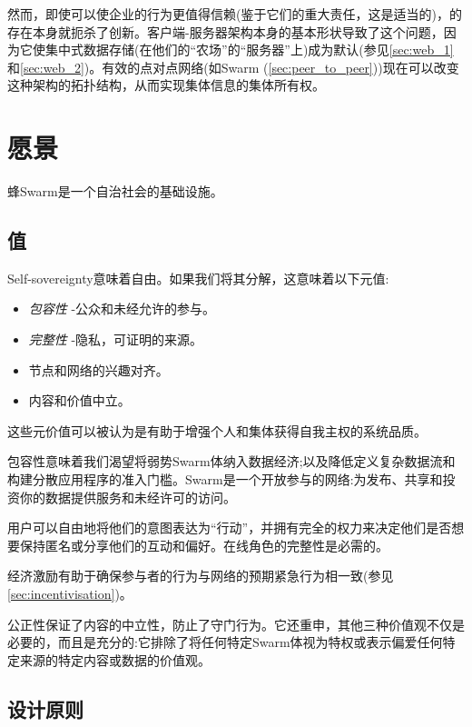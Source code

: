 然而，即使可以使企业的行为更值得信赖(鉴于它们的重大责任，这是适当的)，的存在本身就扼杀了创新。客户端-服务器架构本身的基本形状导致了这个问题，因为它使集中式数据存储(在他们的“农场”的“服务器”上)成为默认(参见\ref{sec:web_1}和\ref{sec:web_2})。有效的点对点网络(如Swarm (\ref{sec:peer_to_peer}))现在可以改变这种架构的拓扑结构，从而实现集体信息的集体所有权。 


\section{愿景\statusorange}\label{sec:vision}


\begin{displayquote}
蜂Swarm是一个自治社会的基础设施。 
\end{displayquote}


\subsection{值\statusorange}\label{sec:values}

Self-sovereignty意味着自由。如果我们将其分解，这意味着以下元值:

\begin{itemize}
\item \emph{包容性} -公众和未经允许的参与。  
\item \emph{完整性} -隐私，可证明的来源。 
\item 节点和网络的兴趣对齐。
\item 内容和价值中立。  
\end{itemize}

这些元价值可以被认为是有助于增强个人和集体获得自我主权的系统品质。

包容性意味着我们渴望将弱势Swarm体纳入数据经济;以及降低定义复杂数据流和构建分散应用程序的准入门槛。Swarm是一个开放参与的网络:为发布、共享和投资你的数据提供服务和未经许可的访问。

用户可以自由地将他们的意图表达为“行动”，并拥有完全的权力来决定他们是否想要保持匿名或分享他们的互动和偏好。在线角色的完整性是必需的。

经济激励有助于确保参与者的行为与网络的预期紧急行为相一致(参见\ref{sec:incentivisation})。

公正性保证了内容的中立性，防止了守门行为。它还重申，其他三种价值观不仅是必要的，而且是充分的:它排除了将任何特定Swarm体视为特权或表示偏爱任何特定来源的特定内容或数据的价值观。 

\subsection{设计原则\statusorange}\label{sec:design-principles}
 


